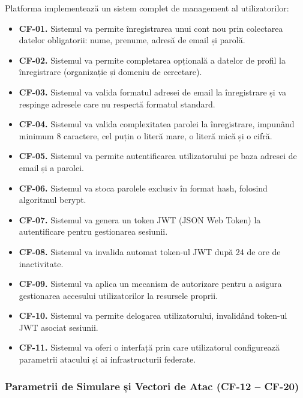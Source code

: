 \documentclass[../../main.tex]{subfiles}
\begin{document}
        Platforma implementează un sistem complet de management al utilizatorilor:
        \begin{itemize}
            \item \textbf{CF-01.} Sistemul va permite înregistrarea unui cont nou prin colectarea datelor obligatorii: nume, prenume, adresă de email și parolă.
            \item \textbf{CF-02.} Sistemul va permite completarea opțională a datelor de profil la înregistrare (organizație și domeniu de cercetare).
            \item \textbf{CF-03.} Sistemul va valida formatul adresei de email la înregistrare și va respinge adresele care nu respectă formatul standard.
            \item \textbf{CF-04.} Sistemul va valida complexitatea parolei la înregistrare, impunând minimum 8 caractere, cel puțin o literă mare, o literă mică și o cifră.
            \item \textbf{CF-05.} Sistemul va permite autentificarea utilizatorului pe baza adresei de email și a parolei.
            \item \textbf{CF-06.} Sistemul va stoca parolele exclusiv în format hash, folosind algoritmul bcrypt.
            \item \textbf{CF-07.} Sistemul va genera un token JWT (JSON Web Token) la autentificare pentru gestionarea sesiunii.
            \item \textbf{CF-08.} Sistemul va invalida automat token-ul JWT după 24 de ore de inactivitate.
            \item \textbf{CF-09.} Sistemul va aplica un mecanism de autorizare pentru a asigura gestionarea accesului utilizatorilor la resursele proprii.
            \item \textbf{CF-10.} Sistemul va permite delogarea utilizatorului, invalidând token-ul JWT asociat sesiunii.
            \item \textbf{CF-11.} Sistemul va oferi o interfață prin care utilizatorul configurează parametrii atacului și ai infrastructurii federate.
        \end{itemize}

        \subsubsection{Parametrii de Simulare și Vectori de Atac (CF-12 -- CF-20)}
\end{document}

